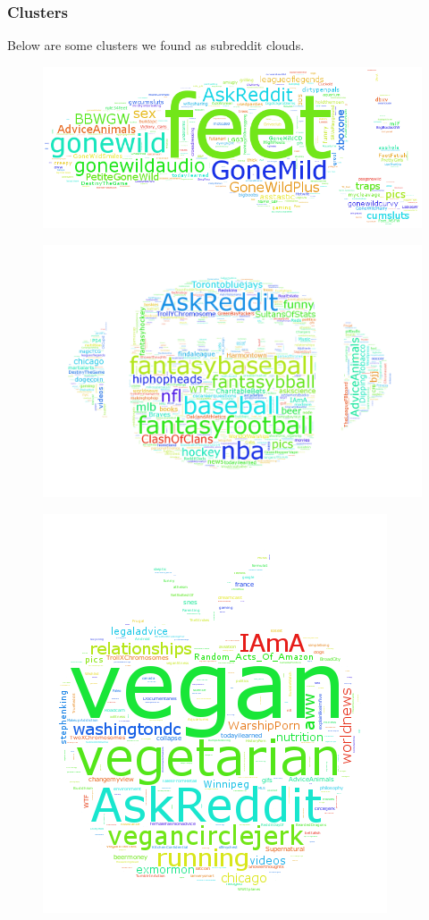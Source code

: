 \documentclass[12pt]{article}
\numberwithin{equation}{section}
\begin{document}
\subsubsection*{Clusters}
Below are some clusters we found as subreddit clouds.
\begin{figure}[h!]
	\centering
	\includegraphics[scale=.5]{feet_16.png}
\end{figure}
\begin{figure}[h!]
	\includegraphics[scale=.3]{football_95.png}
\end{figure}
\begin{figure}[h!]
	\centering
	\includegraphics[scale=.7]{vegan_30.png}
\end{figure}
\end{document}
